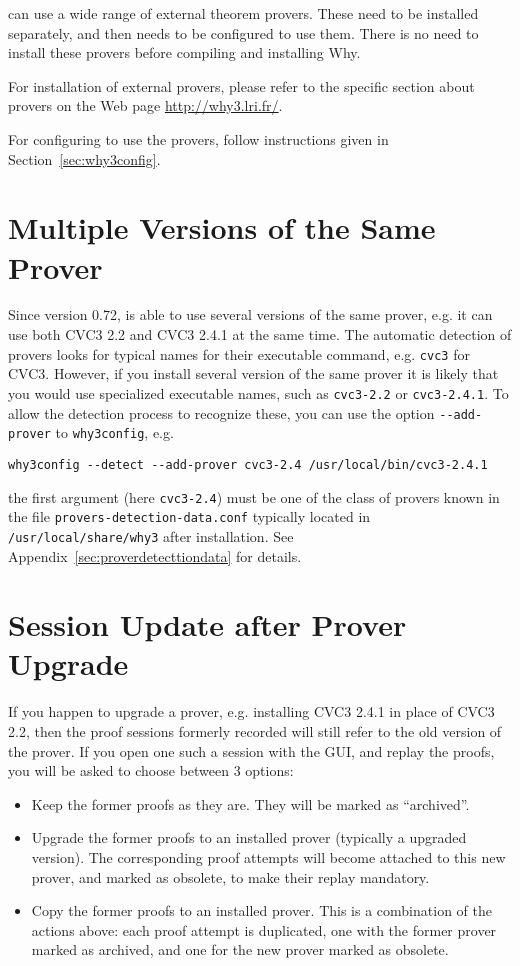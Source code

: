 \why can use a wide range of external theorem provers. These need to
be installed separately, and then \why needs to be configured to use
them. There is no need to install these provers before compiling and
installing Why.

For installation of external provers, please refer to the specific
section about provers on the Web page \url{http://why3.lri.fr/}.

For configuring \why to use the provers, follow instructions given in
Section~\ref{sec:why3config}.

\section{Multiple Versions of the Same Prover}

Since version 0.72, \why is able to use several versions of the same
prover, e.g. it can use both CVC3 2.2 and CVC3 2.4.1 at the same time.
The automatic detection of provers looks for typical names for their
executable command, e.g. \texttt{cvc3} for CVC3. However, if you
install several version of the same prover it is likely that you would
use specialized executable names, such as \texttt{cvc3-2.2} or
\texttt{cvc3-2.4.1}. To allow the \why detection process to recognize
these, you can use the option \verb|--add-prover| to
\texttt{why3config}, e.g.
\begin{verbatim}
why3config --detect --add-prover cvc3-2.4 /usr/local/bin/cvc3-2.4.1
\end{verbatim}
the first argument (here \verb|cvc3-2.4|) must be one of the class of
provers known in the file \verb|provers-detection-data.conf| typically
located in \verb|/usr/local/share/why3| after installation. See
Appendix~\ref{sec:proverdetecttiondata} for details.


\section{Session Update after Prover Upgrade}
\label{sec:uninstalledprovers}

If you happen to upgrade a prover, e.g. installing CVC3 2.4.1 in place
of CVC3 2.2, then the proof sessions formerly recorded will still
refer to the old version of the prover. If you open one such a session
with the GUI, and replay the proofs, you will be asked to choose
between 3 options:
\begin{itemize}
\item Keep the former proofs as they are. They will be marked as
  ``archived''.
\item Upgrade the former proofs to an installed prover (typically a
  upgraded version). The corresponding proof attempts will become
  attached to this new prover, and marked as obsolete, to make their
  replay mandatory.
\item Copy the former proofs to an installed prover. This is a
  combination of the actions above: each proof attempt is duplicated,
  one with the former prover marked as archived, and one for the new
  prover marked as obsolete.
\end{itemize}

